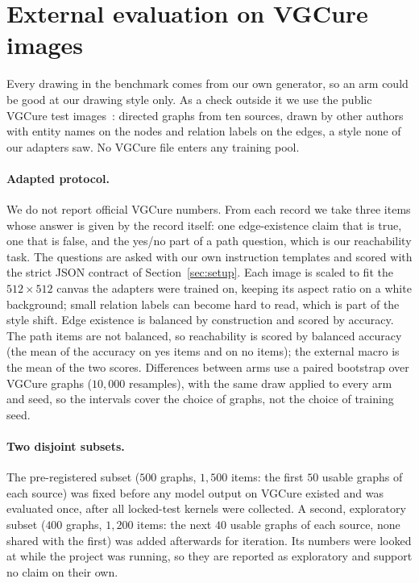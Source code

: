 \section{External evaluation on VGCure images}
\label{sec:external}

Every drawing in the benchmark comes from our own generator, so an arm could be good at our
drawing style only. As a check outside it we use the public VGCure test images~\cite{mcdgraph}:
directed graphs from ten sources, drawn by other authors with entity names on the nodes and
relation labels on the edges, a style none of our adapters saw. No VGCure file enters any
training pool.

\paragraph{Adapted protocol.}
We do not report official VGCure numbers. From each record we take three items whose answer is
given by the record itself: one edge-existence claim that is true, one that is false, and the
yes/no part of a path question, which is our reachability task. The questions are asked with
our own instruction templates and scored with the strict JSON contract of
Section~\ref{sec:setup}. Each image is scaled to fit the $512\times512$ canvas the adapters
were trained on, keeping its aspect ratio on a white background; small relation labels can
become hard to read, which is part of the style shift. Edge existence is balanced by
construction and scored by accuracy. The path items are not balanced, so reachability is scored
by balanced accuracy (the mean of the accuracy on yes items and on no items); the external
macro is the mean of the two scores. Differences between arms use a paired bootstrap over
VGCure graphs ($10{,}000$ resamples), with the same draw applied to every arm and seed, so the
intervals cover the choice of graphs, not the choice of training seed.

\paragraph{Two disjoint subsets.}
The pre-registered subset ($500$ graphs, $1{,}500$ items: the first $50$ usable graphs of each
source) was fixed before any model output on VGCure existed and was evaluated once, after all
locked-test kernels were collected. A second, exploratory subset ($400$ graphs, $1{,}200$ items: the next $40$ usable
graphs of each source, none shared with the first) was added afterwards for iteration. Its
numbers were looked at while the project was running, so they are reported as exploratory and
support no claim on their own.

